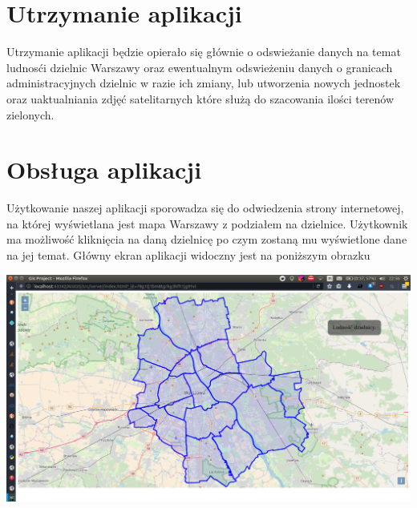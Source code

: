 \documentclass[11pt]{article}
\begin{document}
	\section{Utrzymanie aplikacji}
		Utrzymanie aplikacji będzie opierało się głównie o odswieżanie danych na temat ludnosći dzielnic Warszawy oraz ewentualnym odswieżeniu danych o granicach administracyjnych dzielnic w razie ich zmiany, lub utworzenia nowych jednostek oraz uaktualniania zdjęć satelitarnych które służą do szacowania ilości terenów zielonych.
		
		
		\section{Obsługa aplikacji}
		Użytkowanie naszej aplikacji sporowadza się do odwiedzenia strony internetowej, na której wyświetlana jest mapa Warszawy z podziałem na dzielnice. Użytkownik ma możliwość kliknięcia na daną dzielnicę po czym zostaną mu wyświetlone dane na jej temat. Główny ekran aplikacji widoczny jest na poniższym obrazku
		
\includegraphics[scale=0.3]{app_main_screen} 
\end{document}
